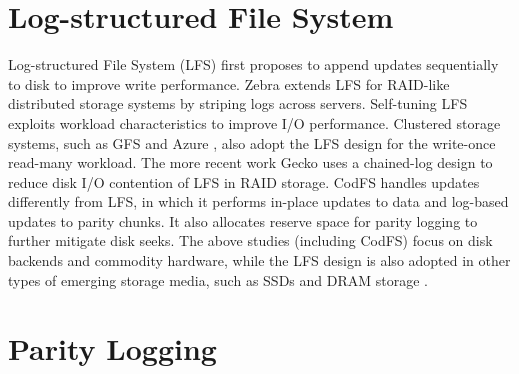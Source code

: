 \section{Log-structured File System}

Log-structured File System (LFS) \cite{rosenblum92} first proposes to append
updates sequentially to disk to improve write performance.  Zebra
\cite{hartman95} extends LFS for RAID-like distributed storage systems by
striping logs across servers.  Self-tuning LFS \cite{matthews97} exploits
workload characteristics to improve I/O performance.  Clustered storage
systems, such as GFS \cite{ghemawat03} and Azure \cite{calder11}, also adopt
the LFS design for the write-once read-many workload.  The more recent work
Gecko \cite{shin13} uses a chained-log design to reduce disk I/O contention of
LFS in RAID storage.  CodFS handles updates differently from LFS, in which it
performs in-place updates to data and log-based updates to parity chunks.  It
also allocates reserve space for parity logging to further mitigate disk
seeks.  The above studies (including CodFS) focus on disk backends and
commodity hardware, while the LFS design is also adopted in other types of
emerging storage media, such as SSDs \cite{agrawal08} and DRAM storage
\cite{ongaro11}.  



\section{Parity Logging}

